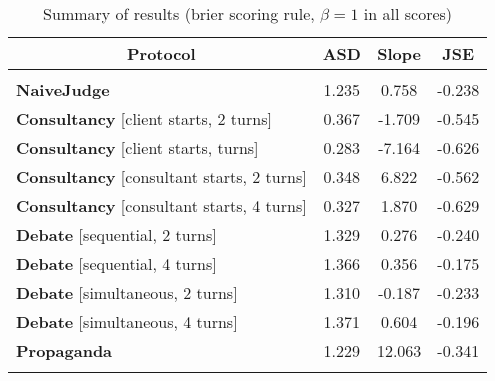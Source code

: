 \begin{table}[t]
\caption{Summary of results (brier scoring rule, $\beta=1$ in all scores)}
\label{tab:protocol-comparison}
\begin{center}
\begin{tabular}{lccc}
\multicolumn{1}{c}{\bf Protocol} & \multicolumn{1}{c}{\bf ASD} & \multicolumn{1}{c}{\bf Slope} & \multicolumn{1}{c}{\bf JSE} \\
\hline \\
\textbf{NaiveJudge} & 1.235 & 0.758 & -0.238 \\
\textbf{Consultancy} [client starts, 2 turns] & 0.367 & -1.709 & -0.545 \\
\textbf{Consultancy} [client starts, turns] & 0.283 & -7.164 & -0.626 \\
\textbf{Consultancy} [consultant starts, 2 turns] & 0.348 & 6.822 & -0.562 \\
\textbf{Consultancy} [consultant starts, 4 turns] & 0.327 & 1.870 & -0.629 \\
\textbf{Debate} [sequential, 2 turns] & 1.329 & 0.276 & -0.240 \\
\textbf{Debate} [sequential, 4 turns] & 1.366 & 0.356 & -0.175 \\
\textbf{Debate} [simultaneous, 2 turns] & 1.310 & -0.187 & -0.233 \\
\textbf{Debate} [simultaneous, 4 turns] & 1.371 & 0.604 & -0.196 \\
\textbf{Propaganda} & 1.229 & 12.063 & -0.341 \\
\\
\end{tabular}
\end{center}
\label{tab:results}
\end{table}